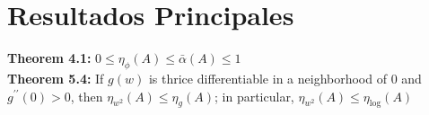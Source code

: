 \section{Resultados Principales}
\noindent\textbf{Theorem 4.1:} $0 \leq \eta_{\phi}(A) \leq \bar{\alpha}(A) \leq 1$ \\
\textbf{Theorem 5.4:} If $g(w)$ is thrice differentiable in a neighborhood of $0$ and $g^{\prime\prime} (0) > 0$, then $\eta_{w^2}(A) \leq \eta_g(A)$; in particular, $\eta_{w^2}(A) \leq \eta_{\operatorname{log}}(A)$
